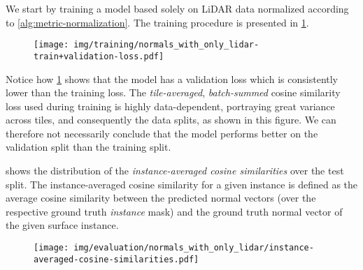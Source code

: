 We start by training a model based solely on LiDAR data normalized according to \cref{alg:metric-normalization}.
The training procedure is presented in \cref{fig:lidar-training}.
%
\begin{figure}[H]
  \texttt{[image: img/training/normals\_with\_only\_lidar-train+validation-loss.pdf]}
  \label{fig:lidar-training}
\end{figure}
\noindent
Notice how \cref{fig:lidar-training} shows that the model has a validation loss which is consistently lower than the training loss.
The \textit{tile-averaged}, \textit{batch-summed} cosine similarity loss used during training is highly data-dependent, portraying great variance across tiles, and consequently the data splits, as shown in this figure.
We can therefore not necessarily conclude that the model performs better on the validation split than the training split.

 shows the distribution of the \textit{instance-averaged cosine similarities} over the test split.
The instance-averaged cosine similarity for a given instance is defined as the average cosine similarity between the predicted normal vectors (over the respective ground truth \emph{instance} mask) and the ground truth normal vector of the given surface instance.

\begin{figure}[H]
  \texttt{[image: img/evaluation/normals\_with\_only\_lidar/instance-averaged-cosine-similarities.pdf]}
  \label{fig:lidar-test-distribution}
\end{figure}

